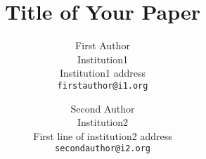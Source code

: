 \documentclass[10pt,twocolumn,letterpaper]{article}
\begin{document}
\title{Title of Your Paper}

\author{First Author\\
Institution1\\
Institution1 address\\
{\tt\small firstauthor@i1.org}
\and
Second Author\\
Institution2\\
First line of institution2 address\\
{\tt\small secondauthor@i2.org}
}
\maketitle














\clearpage
{\small


}
\end{document}
